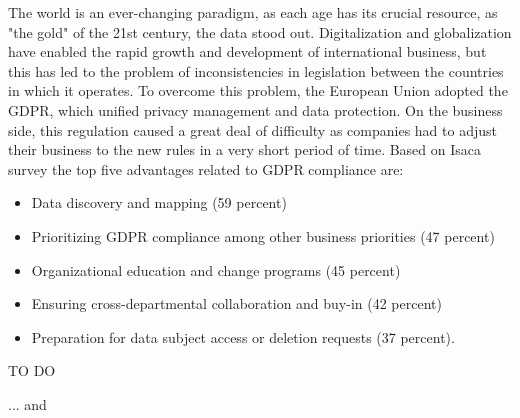 \documentclass[11pt,english]{article}
\begin{document}
The world is an ever-changing paradigm, as each age has its crucial resource, as "the gold" of the 21st century, the data stood out. Digitalization and globalization have enabled the rapid growth and development of international business, but this has led to the problem of inconsistencies in legislation between the countries in which it operates. To overcome this problem, the European Union adopted the GDPR, which unified privacy management and data protection. On the business side, this regulation caused a great deal of difficulty as companies had to adjust their business to the new rules in a very short period of time. Based on Isaca survey \cite{isaca} the top five advantages related to GDPR compliance are:
\begin{itemize}
  \item Data discovery and mapping (59 percent)
  \item Prioritizing GDPR compliance among other business priorities (47 percent)
  \item Organizational education and change programs (45 percent)
  \item Ensuring cross-departmental collaboration and buy-in (42 percent)
  \item Preparation for data subject access or deletion requests (37 percent).
\end{itemize}


TO DO


... and \cite{lipswitch}

\printbibliography
\end{document}
